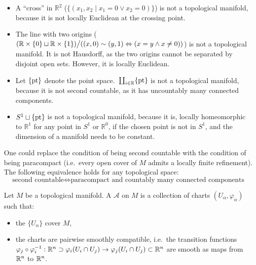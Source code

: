 \documentclass[a4paper,11pt]{article}
\begin{document}
\begin{nonexs}
    \begin{itemize}
        \item A \enquote{cross} in \(\mathbb{R}^2\) (\(\{(x_1,x_2\mid x_1=0 \lor x_2=0)\}\)) is not a topological manifold, because it is not locally Euclidean at the crossing point. 
        \item The line with two origins (\((\mathbb{R}\times\{0\}\sqcup\mathbb{R}\times\{1\})\big/((x,0)\sim(y,1)\Leftrightarrow (x=y \land x\neq 0))\)) is not a topological manifold. It is not Hausdorff, as the two origins cannot be separated by disjoint open sets. However, it is locally Euclidean.
        \item Let \(\{\mathrm{pt}\}\) denote the point space.\ \(\coprod_{i\in \mathbb{R}}\{\mathrm{pt}\}\) is not a topological manifold, because it is not second countable, as it has uncountably many connected components.
        \item \(S^1\sqcup\{\mathrm{pt}\}\) is not a topological manifold, because it is, locally homeomorphic to \(\mathbb{R}^1\) for any point in \(S^1\) or \(\mathbb{R}^0\), if the chosen point is not in \(S^1\), and the dimension of a manifold needs to be constant.
    \end{itemize}
\end{nonexs}

\begin{remark}
    One could replace the condition of being second countable with the condition of being paracompact (i.e.\ every open cover of \(M\) admits a locally finite refinement). The following equivalence holds for any topological space:
    \[\text{second countable}\iff \text{paracompact and countably many connected components}\]
\end{remark}




\begin{definition}
    Let \(M\) be a topological manifold. A  \(\mathcal{A}\) on \(M\) is a collection of charts \((U_\alpha,\varphi_\alpha)\) such that:
    \begin{itemize}
        \item the \(\{U_\alpha\}\) cover \(M\),
        \item the charts are pairwise smoothly compatible, i.e.\ the transition functions 
        \(\varphi_j \circ \varphi_i^{-1}:\mathbb{R}^n\supset\varphi_i(U_i\cap U_j)\to\varphi_j(U_i\cap U_j)\subset\mathbb{R}^n\) are smooth as maps from \(\mathbb{R}^n\) to \(\mathbb{R}^n\).
    \end{itemize}
\end{definition}
\end{document}
